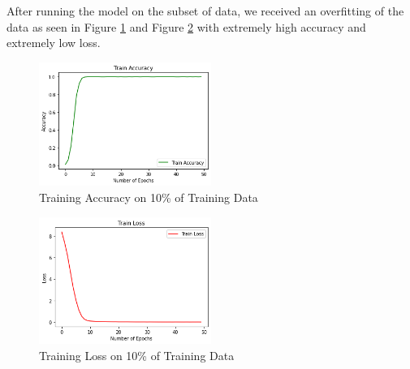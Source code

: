 \documentclass[paper=a4, fontsize=11pt]{scrartcl}
\numberwithin{equation}{section}		%
\numberwithin{table}{section}				%
\begin{document}
After running the model on the subset of data, we received an overfitting of the data as seen in Figure \ref{fig:cnn_acc_10p} and Figure \ref{fig:cnn_loss_10p} with extremely high accuracy and extremely low loss.

\begin{figure}[h]
    \centering
    \includegraphics[width=0.5\textwidth]{training_cnn_acc_10p.png}
    \caption{Training Accuracy on 10\% of Training Data}
    \label{fig:cnn_acc_10p}
\end{figure}

\begin{figure}[h]
    \centering
    \includegraphics[width=0.5\textwidth]{training_10p_loss.png}
    \caption{Training Loss on 10\% of Training Data}
    \label{fig:cnn_loss_10p}
\end{figure}
\end{document}
